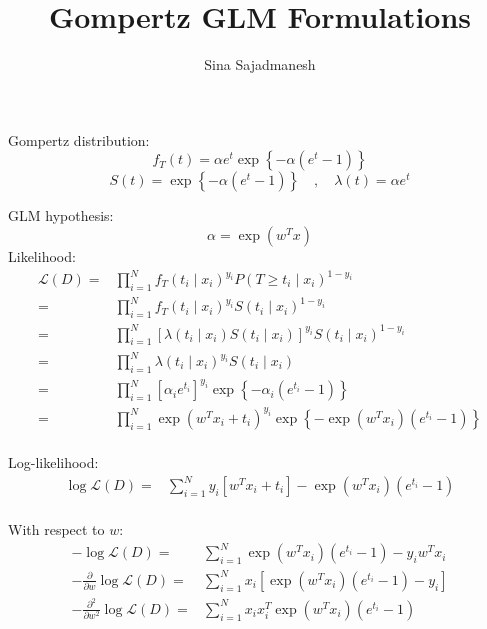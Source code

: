 \documentclass[]{article}
\title{Gompertz GLM Formulations}
\author{Sina Sajadmanesh}
\begin{document}
\maketitle

Gompertz distribution:
\[f_T(t)=\alpha e^t\exp\left\lbrace -\alpha(e^t-1) \right\rbrace\]
\[S(t)=\exp\left\lbrace -\alpha(e^t-1) \right\rbrace  \quad,\quad  \lambda(t)=\alpha e^t\]

GLM hypothesis:
\[\alpha=\exp(w^Tx)\]
Likelihood:
\begin{equation*}
\begin{split}
\mathcal{L}(D)=&\prod_{i=1}^{N}f_T(t_i\mid x_i)^{y_i}P(T\ge t_i\mid x_i)^{1-y_i}\\
=&\prod_{i=1}^{N}f_T(t_i\mid x_i)^{y_i}S(t_i\mid x_i)^{1-y_i}\\
=&\prod_{i=1}^{N}[\lambda(t_i\mid x_i)S(t_i\mid x_i)]^{y_i}S(t_i\mid x_i)^{1-y_i}\\
=&\prod_{i=1}^{N}\lambda(t_i\mid x_i)^{y_i}S(t_i\mid x_i)\\
=&\prod_{i=1}^{N}\left[\alpha_ie^{t_i}\right]^{y_i}\exp\left\lbrace -\alpha_i(e^{t_i}-1) \right\rbrace\\
=&\prod_{i=1}^{N}\exp(w^Tx_i+t_i)^{y_i}\exp\left\lbrace -\exp(w^Tx_i)(e^{t_i}-1) \right\rbrace\\
\end{split}
\end{equation*}

Log-likelihood:
\begin{equation*}
\begin{split}
\log\mathcal{L}(D)
=&\sum_{i=1}^{N}y_i[w^Tx_i+t_i]-\exp(w^Tx_i)(e^{t_i}-1)\\
\end{split}
\end{equation*}

With respect to $w$:
\begin{equation*}
\begin{split}
-\log\mathcal{L}(D)=&\sum_{i=1}^{N}\exp(w^Tx_i)(e^{t_i}-1)-y_iw^Tx_i\\
-\frac{\partial}{\partial w}\log\mathcal{L}(D)=&\sum_{i=1}^{N}x_i\left[\exp(w^Tx_i)(e^{t_i}-1)-y_i\right]\\
-\frac{\partial^2}{\partial w^2}\log\mathcal{L}(D)=&\sum_{i=1}^{N}x_ix_i^T\exp(w^Tx_i)(e^{t_i}-1)\\
\end{split}
\end{equation*}
\end{document}
